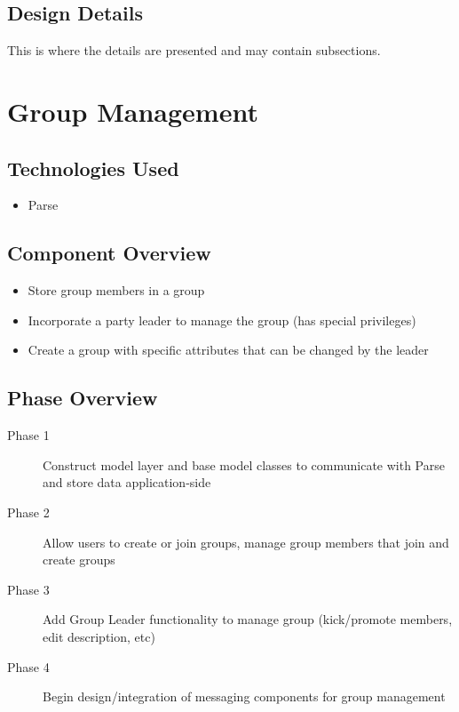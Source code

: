 \subsection{Design Details}
This is where the details are presented and may contain subsections. 

\section{Group Management }

\subsection{Technologies  Used}
\begin{itemize}
  \item Parse
\end{itemize}

\subsection{Component  Overview}
\begin{itemize}
  \item Store group members in a group
  \item Incorporate a party leader to manage the group (has special privileges)
  \item Create a group with specific attributes that can be changed by the leader
\end{itemize}

\subsection{Phase Overview}
\begin{description}
  \item [Phase 1] Construct model layer and base model classes to communicate with Parse and store data application-side
  \item [Phase 2] Allow users to create or join groups, manage group members that join and create groups
  \item [Phase 3] Add Group Leader functionality to manage group (kick/promote members, edit description, etc)
  \item [Phase 4] Begin design/integration of messaging components for group management
\end{description}
